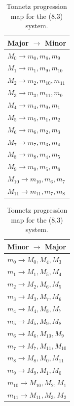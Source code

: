 \documentclass[11pt,letterpaper]{amsart}
\begin{document}
{\tiny \begin{table}[H]
    \centering
    \begin{minipage}{0.48\textwidth}
        \centering
        \begin{tabular}{l}
        \toprule
        \textbf{Major $\to$ Minor} \\
        \midrule
        $M_0 \to m_0, m_8, m_9$ \\
        $M_1 \to m_1, m_9, m_{10}$ \\
        $M_2 \to m_2, m_{10}, m_{11}$ \\
        $M_3 \to m_3, m_{11}, m_0$ \\
        $M_4 \to m_4, m_0, m_1$ \\
        $M_5 \to m_5, m_1, m_2$ \\
        $M_6 \to m_6, m_2, m_3$ \\
        $M_7 \to m_7, m_3, m_4$ \\
        $M_8 \to m_8, m_4, m_5$ \\
        $M_9 \to m_9, m_5, m_6$ \\
        $M_{10} \to m_{10}, m_6, m_7$ \\
        $M_{11} \to m_{11}, m_7, m_8$ \\
        \bottomrule
        \end{tabular}
    \end{minipage}\hfill
    \begin{minipage}{0.48\textwidth}
        \centering
        \begin{tabular}{l}
        \toprule
        \textbf{Minor $\to$ Major} \\
        \midrule
        $m_0 \to M_0, M_4, M_3$ \\
        $m_1 \to M_1, M_5, M_4$ \\
        $m_2 \to M_2, M_6, M_5$ \\
        $m_3 \to M_3, M_7, M_6$ \\
        $m_4 \to M_4, M_8, M_7$ \\
        $m_5 \to M_5, M_9, M_8$ \\
        $m_6 \to M_6, M_{10}, M_9$ \\
        $m_7 \to M_7, M_{11}, M_{10}$ \\
        $m_8 \to M_8, M_0, M_{11}$ \\
        $m_9 \to M_9, M_1, M_0$ \\
        $m_{10} \to M_{10}, M_2, M_1$ \\
        $m_{11} \to M_{11}, M_3, M_2$ \\
        \bottomrule
        \end{tabular}
    \end{minipage}
    \caption{Tonnetz progression map for the (8,3) system.}
\end{table}}
\end{document}

